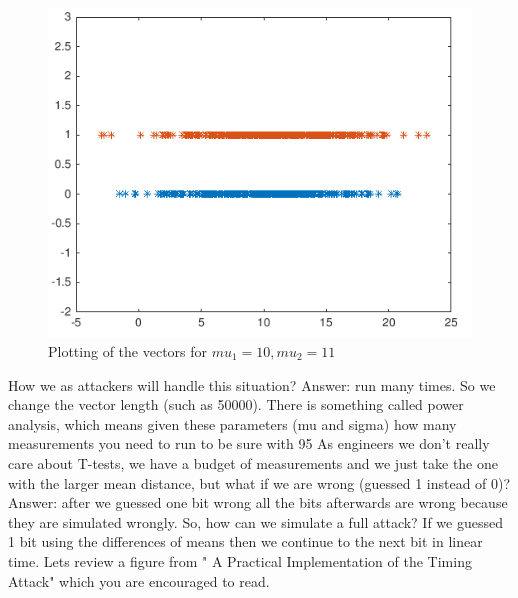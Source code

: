 \begin{figure}[!ht]
    \centering
    \includegraphics[scale=0.6]{images/defmatplot2.png}
    \caption{Plotting of the vectors for \(mu_1 = 10, mu_2 = 11\)} \label{fig:defmatplot2}
\end{figure}

How we as attackers will handle this situation? Answer: run many times. So we change the vector length (such as 50000). There is something called power analysis, which means given these parameters (mu and sigma) how many measurements you need to run to be sure with 95%
As engineers we don't really care about T-tests, we have a budget of measurements and we just take the one with the larger mean distance, but what if we are wrong (guessed 1 instead of 0)? Answer: after we guessed one bit wrong all the bits afterwards are wrong because they are simulated wrongly.
So, how can we simulate a full attack? If we guessed 1 bit using the differences of means then we continue to the next bit in linear time. Lets review  a figure from " A Practical Implementation of the Timing Attack" which you are encouraged to read.


